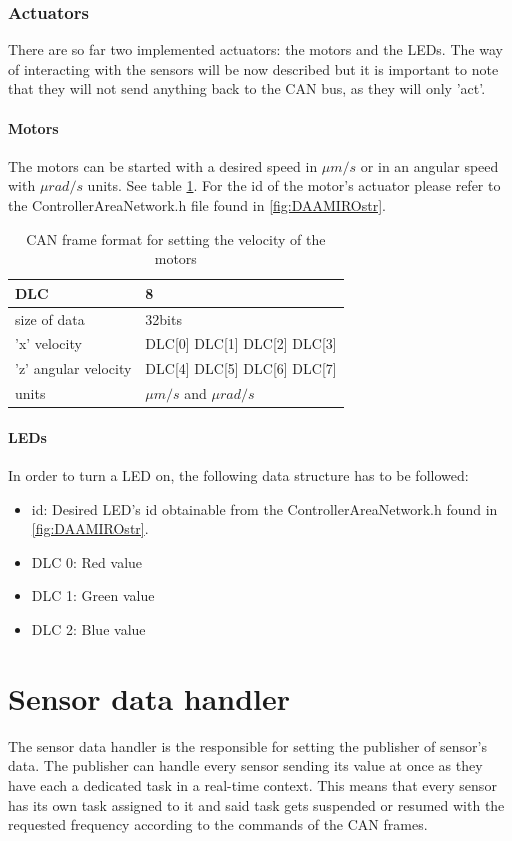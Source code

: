 \documentclass[12pt]{report}%
\begin{document}
\subsection{Actuators}
There are so far two implemented actuators: the motors and the LEDs. The way of interacting with the sensors will be now described but it is important to note that they will not send anything back to the CAN bus, as they will only 'act'.

\subsubsection{Motors}
The motors can be started with a desired speed in $\mu m/s$ or in an angular speed with $\mu rad/s$ units. See table \ref{tab:setvelocity}. For the id of the motor's actuator please refer to the ControllerAreaNetwork.h file found in \ref{fig:DAAMIROstr}.

\begin{table}[h!]
\centering
\begin{tabular}{|l|l|}
	\hline
	DLC										&	8														\\	\hline
	size of data					&	32bits											\\	\hline
	'x' velocity					&	DLC[0] DLC[1] DLC[2] DLC[3]	\\	\hline
	'z'	angular velocity	&	DLC[4] DLC[5] DLC[6] DLC[7]	\\	\hline
	units									&	$\mu m/s$ and $\mu rad/s$		\\	\hline
\end{tabular}
\caption{\label{tab:setvelocity} CAN frame format for setting the velocity of the motors}
\end{table}

\subsubsection{LEDs}
\label{sub:CANleds}
In order to turn a LED on, the following data structure has to be followed:

\begin{itemize}
	\item id: Desired LED's id obtainable from the ControllerAreaNetwork.h found in \ref{fig:DAAMIROstr}.
	\item DLC 0: Red value
	\item DLC 1: Green value
	\item DLC 2: Blue value
\end{itemize}

\chapter{Sensor data handler}
\label{chap:sensorDH}
The sensor data handler is the responsible for setting the publisher of sensor's data. The publisher can handle every sensor sending its value at once as they have each a dedicated task in a real-time context. This means that every sensor has its own task assigned to it and said task gets suspended or resumed with the requested frequency according to the commands of the CAN frames.
\end{document}
